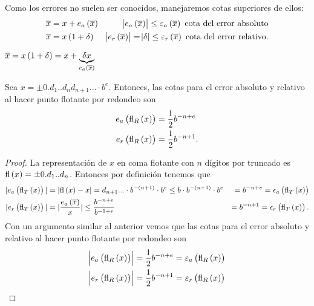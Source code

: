 \begin{obs}
    Como los errores no suelen ser conocidos, manejaremos cotas superiores de ellos:    \begin{align*}
	\overline{x} &= x + e_a\left( \overline{x}\right)  & \abs{e_a\left( \overline{x}\right) } \leq \varepsilon_a\left( \overline{x}\right)  \text{ cota del error absoluto} \\
	\overline{x} &= x\left( 1 + \delta\right)  & \abs{e_r\left( \overline{x}\right) }=\abs{\delta} \leq \varepsilon_r\left( \overline{x}\right)  \text{ cota del error relativo}.
    \end{align*}
\end{obs}

\begin{obs}
    $\overline{x} = x\left( 1 + \delta\right)  = x + \underbrace{\delta x}_{e_a\left( \overline{x}\right) }$
\end{obs}
  
\begin{prop} 
  Sea $x = \pm 0.d_1..d_nd_{n+1}... \cdot b^e$. Entonces, las cotas para el error absoluto y relativo al hacer punto flotante por redondeo son
  \begin{align*}
    e_a\left( \text{fl}_R\left( x\right) \right)  &=  \frac{1}{2}b^{-n+e} \\
    e_r\left( \text{fl}_R\left( x\right) \right)  &=  \frac{1}{2}b^{-n+1}.
  \end{align*}
\end{prop}
\begin{proof}
   La representación de $x$ en coma flotante con $n$ dígitos por truncado es $\text{fl}\left( x\right)  = \pm 0.d_1..d_n$. Entonces por definición tenemos que
    \begin{align*}
            |e_a\left( \text{fl}_T\left( x\right) \right) | &= |\text{fl}\left( x\right)  - x| = d_{n+1}... \cdot b^{-\left( n+1\right) } \cdot b^e \leq b \cdot b^{-\left( n+1\right) } \cdot b^e &= b^{-n+e} = \epsilon_a\left( \text{fl}_T\left( x\right) \right)  \\
            |e_r\left( \text{fl}_T\left( x\right) \right) | &= |\frac{e_a\left( \overline{x}\right) }{x}| \leq \frac{b^{-n+e}}{b^{-1+e}} &= b^{-n+1} = \epsilon_r\left( \text{fl}_T\left( x\right) \right) .
    \end{align*}
    Con un argumento similar al anterior vemos que las cotas para el error absoluto y relativo al hacer punto flotante por redondeo son
    \begin{align*}
            \abs{e_a\left( \text{fl}_R\left( x\right) \right) } &=  \frac{1}{2}b^{-n+e} = \varepsilon_a\left( \text{fl}_R\left( x\right) \right)  \\
            \abs{e_r\left( \text{fl}_R\left( x\right) \right) } &=  \frac{1}{2}b^{-n+1} = \varepsilon_r\left( \text{fl}_R\left( x\right) \right) 
    \end{align*}
\end{proof}
 

